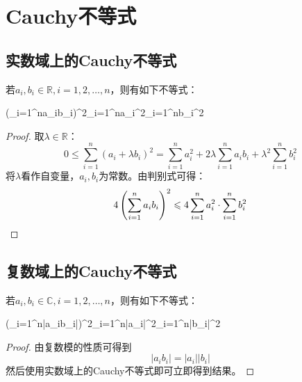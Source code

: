 \section{Cauchy不等式}

\subsection{实数域上的Cauchy不等式}
\begin{theorem}
	若$a_i,b_i\in\mathbb{R},i=1,2,\dots,n$，则有如下不等式：
	\begin{inequality*}\label{ineq:cauchy-ineq-R}
		\left(\sum_{i=1}^na_ib_i\right)^2\leqslant\sum_{i=1}^na_i^2\cdot\sum_{i=1}^nb_i^2
	\end{inequality*}
\end{theorem}
\begin{proof}
	取$\lambda\in\mathbb{R}$：
	\begin{equation*}
		0\leqslant\sum_{i=1}^n\left(a_i+\lambda b_i\right)^2=
		\sum_{i=1}^na_i^2+2\lambda\sum_{i=1}^na_ib_i+\lambda^2\sum_{i=1}^nb_i^2
	\end{equation*}
	将$\lambda$看作自变量，$a_i,b_i$为常数。由判别式可得：
	\begin{equation*}
		4\left(\sum_{i=1}^na_ib_i\right)^2\leqslant4\sum_{i=1}^na_i^2\cdot\sum_{i=1}^nb_i^2\qedhere
	\end{equation*}
\end{proof}

\subsection{复数域上的Cauchy不等式}
\begin{theorem}
	若$a_i,b_i\in\mathbb{C},i=1,2,\dots,n$，则有如下不等式：
	\begin{inequality*}\label{ineq:cauchy-ineq-C}
		\left(\sum_{i=1}^n|a_ib_i|\right)^2\leqslant\sum_{i=1}^n|a_i|^2\cdot\sum_{i=1}^n|b_i|^2
	\end{inequality*}
\end{theorem}
\begin{proof}
	由复数模的性质可得到
	\begin{equation*}
		|a_ib_i|=|a_i||b_i|
	\end{equation*}
	然后使用实数域上的Cauchy不等式即可立即得到结果。
\end{proof}

